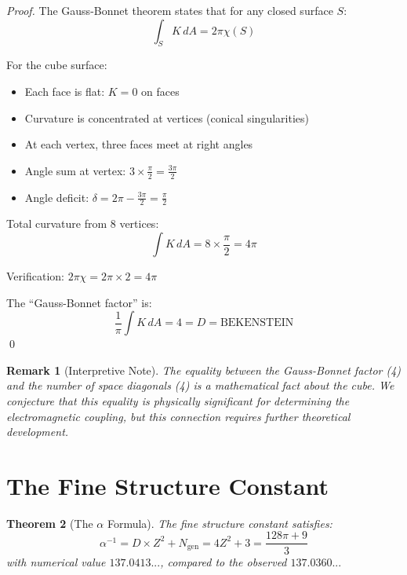 \documentclass[twocolumn,showpacs,preprintnumbers,amsmath,amssymb,prd]{revtex4-2}
\newtheorem{theorem}{Theorem}[section]
\newtheorem{remark}[theorem]{Remark}
\begin{document}
\begin{proof}
The Gauss-Bonnet theorem states that for any closed surface $S$:
\begin{equation}
\int_S K \, dA = 2\pi\chi(S)
\end{equation}

For the cube surface:
\begin{itemize}
\item Each face is flat: $K = 0$ on faces
\item Curvature is concentrated at vertices (conical singularities)
\item At each vertex, three faces meet at right angles
\item Angle sum at vertex: $3 \times \frac{\pi}{2} = \frac{3\pi}{2}$
\item Angle deficit: $\delta = 2\pi - \frac{3\pi}{2} = \frac{\pi}{2}$
\end{itemize}

Total curvature from 8 vertices:
\begin{equation}
\int K \, dA = 8 \times \frac{\pi}{2} = 4\pi
\end{equation}

Verification: $2\pi\chi = 2\pi \times 2 = 4\pi$ \checkmark

The ``Gauss-Bonnet factor'' is:
\begin{equation}
\frac{1}{\pi}\int K \, dA = 4 = D = \text{BEKENSTEIN}
\end{equation}
\qed
\end{proof}

\begin{remark}[Interpretive Note]
The equality between the Gauss-Bonnet factor (4) and the number of space diagonals (4) is a mathematical fact about the cube. We \emph{conjecture} that this equality is physically significant for determining the electromagnetic coupling, but this connection requires further theoretical development.
\end{remark}

\section{The Fine Structure Constant}

\begin{theorem}[The $\alpha$ Formula]
\label{thm:alpha}
The fine structure constant satisfies:
\begin{equation}
\boxed{\alpha^{-1} = D \times Z^2 + N_{\text{gen}} = 4Z^2 + 3 = \frac{128\pi + 9}{3}}
\end{equation}
with numerical value $137.0413...$, compared to the observed $137.0360...$
\end{theorem}
\end{document}
